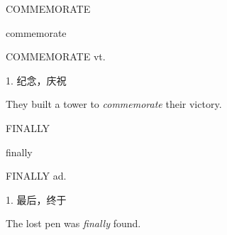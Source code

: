 \begin{flashcard}{
COMMEMORATE

commemorate
}
\begin{center}
COMMEMORATE vt. 
\end{center}
1. 纪念，庆祝

They built a tower to \textit{commemorate} their victory.

\end{flashcard}
\begin{flashcard}{
FINALLY

finally
}
\begin{center}
FINALLY ad. 
\end{center}
1. 最后，终于

The lost pen was \textit{finally} found.

\end{flashcard}
